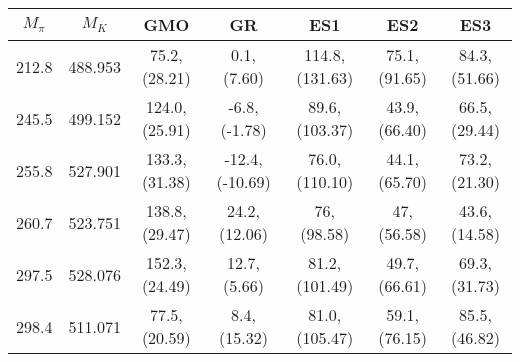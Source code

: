 \documentclass[10pt,a4paper]{article}
\begin{document}
					\begin{table}[h!]
						\begin{tabular}{ccccccc}
							$M_\pi$ & $M_K$ & GMO & GR & ES1 & ES2 & ES3 \\
							\hline 212.8 & 488.953 & 75.2,({\color{blue}28.21}) & 0.1,({\color{blue}7.60}) & 114.8,({\color{blue}131.63}) & 75.1,({\color{blue}91.65}) & 84.3,({\color{blue}51.66}) \\
							245.5 & 499.152  & 124.0,({\color{blue}25.91}) & -6.8,({\color{blue}-1.78}) & 89.6,({\color{blue}103.37}) & 43.9,({\color{blue}66.40}) & 66.5,({\color{blue}29.44}) \\
							255.8 & 527.901 & 133.3,({\color{blue}31.38}) & -12.4,({\color{blue}-10.69}) & 76.0,({\color{blue}110.10}) & 44.1,({\color{blue}65.70}) & 73.2,({\color{blue}21.30}) \\ 
							260.7 & 523.751 & 138.8,({\color{blue}29.47}) & 24.2,({\color{blue}12.06}) & 76,({\color{blue}98.58}) & 47,({\color{blue}56.58}) & 43.6,({\color{blue}14.58}) \\
							297.5 & 528.076 & 152.3,({\color{blue}24.49}) & 12.7,({\color{blue}5.66}) & 81.2,({\color{blue}101.49}) & 49.7,({\color{blue}66.61}) & 69.3,({\color{blue}31.73}) \\
							298.4 & 511.071 & 77.5,({\color{blue}20.59}) & 8.4,({\color{blue}15.32}) & 81.0,({\color{blue}105.47}) & 59.1,({\color{blue}76.15}) & 85.5,({\color{blue}46.82}) \\ 
							\hline
						\end{tabular}
					\end{table}
					
					
					
					
\end{document}
